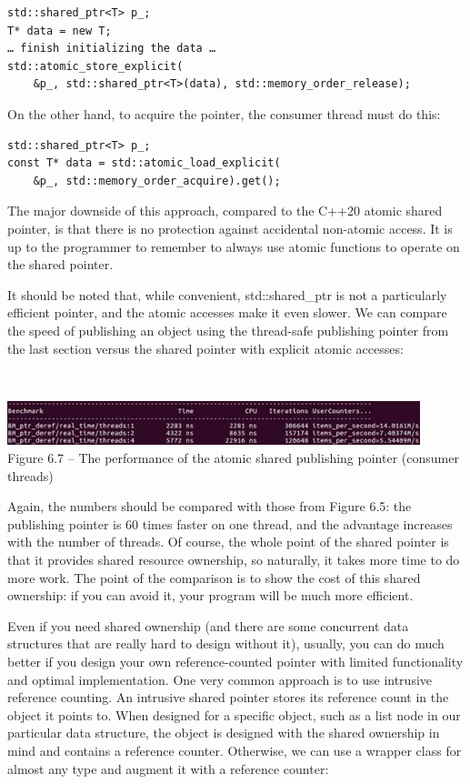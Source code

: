\begin{lstlisting}[style=styleCXX]
std::shared_ptr<T> p_;
T* data = new T;
… finish initializing the data …
std::atomic_store_explicit(
	&p_, std::shared_ptr<T>(data), std::memory_order_release);
\end{lstlisting}

On the other hand, to acquire the pointer, the consumer thread must do this:

\begin{lstlisting}[style=styleCXX]
std::shared_ptr<T> p_;
const T* data = std::atomic_load_explicit(
	&p_, std::memory_order_acquire).get();
\end{lstlisting}

The major downside of this approach, compared to the C++20 atomic shared pointer, is that there is no protection against accidental non-atomic access. It is up to the programmer to remember to always use atomic functions to operate on the shared pointer.

It should be noted that, while convenient, std::shared\_ptr is not a particularly efficient pointer, and the atomic accesses make it even slower. We can compare the speed of publishing an object using the thread-safe publishing pointer from the last section versus the shared pointer with explicit atomic accesses:

\hspace*{\fill} \\ %
\begin{center}
\includegraphics[width=0.9\textwidth]{content/2/chapter6/images/7.jpg}\\
Figure 6.7 – The performance of the atomic shared publishing pointer (consumer threads)
\end{center}

Again, the numbers should be compared with those from Figure 6.5: the publishing pointer is 60 times faster on one thread, and the advantage increases with the number of threads. Of course, the whole point of the shared pointer is that it provides shared resource ownership, so naturally, it takes more time to do more work. The point of the comparison is to show the cost of this shared ownership: if you can avoid it, your program will be much more efficient.

Even if you need shared ownership (and there are some concurrent data structures that are really hard to design without it), usually, you can do much better if you design your own reference-counted pointer with limited functionality and optimal implementation. One very common approach is to use intrusive reference counting. An intrusive shared pointer stores its reference count in the object it points to. When designed for a specific object, such as a list node in our particular data structure, the object is designed with the shared ownership in mind and contains a reference counter. Otherwise, we can use a wrapper class for almost any type and augment it with a reference counter:


